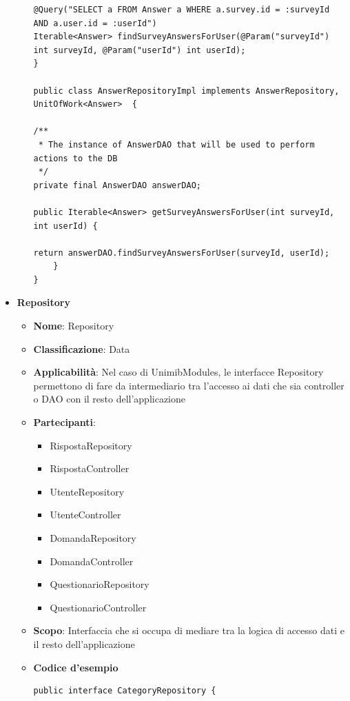 \documentclass[12pt]{article}
\begin{document}
\begin{itemize}
\begin{itemize}
\begin{lstlisting}
@Query("SELECT a FROM Answer a WHERE a.survey.id = :surveyId AND a.user.id = :userId")
Iterable<Answer> findSurveyAnswersForUser(@Param("surveyId") int surveyId, @Param("userId") int userId);
}

public class AnswerRepositoryImpl implements AnswerRepository, UnitOfWork<Answer>  {

/**
 * The instance of AnswerDAO that will be used to perform actions to the DB
 */
private final AnswerDAO answerDAO;

public Iterable<Answer> getSurveyAnswersForUser(int surveyId, int userId) {

return answerDAO.findSurveyAnswersForUser(surveyId, userId);
    }
}
            \end{lstlisting}
        \end{itemize}
		
		\item \textbf{Repository}
		\begin{itemize}
		\item \textbf{Nome}: Repository
            \item \textbf{Classificazione}: Data
            \item \textbf{Applicabilità}: Nel caso di UnimibModules, le interfacce Repository permettono di fare da intermediario tra l'accesso ai dati che sia controller o DAO con il resto dell'applicazione
            \item \textbf{Partecipanti}:
                \begin{itemize}
                    \item RispostaRepository
                    \item RispostaController
                    \item UtenteRepository
                    \item UtenteController
                    \item DomandaRepository
                    \item DomandaController
                    \item QuestionarioRepository
                    \item QuestionarioController
                \end{itemize}
            \item \textbf{Scopo}: Interfaccia che si occupa di mediare tra la logica di accesso dati e il resto dell'applicazione
            \item \textbf{Codice d'esempio}
            \begin{lstlisting}
public interface CategoryRepository {


\end{lstlisting}
\end{itemize}
\end{itemize}
\end{document}

